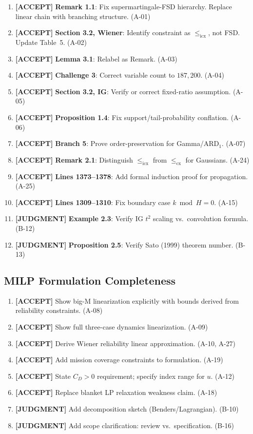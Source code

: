 \documentclass[11pt,a4paper]{article}
\newcommand{\acceptlabel}{\textbf{\textcolor{acceptgreen}{[ACCEPT]}}}
\newcommand{\judgmentlabel}{\textbf{\textcolor{judgmentorange}{[JUDGMENT]}}}
\begin{document}
\begin{enumerate}[label=\arabic*.,leftmargin=2em]
  \item \acceptlabel{} \textbf{Remark 1.1}: Fix supermartingale-FSD hierarchy. Replace linear chain with branching structure. (A-01)
  \item \acceptlabel{} \textbf{Section 3.2, Wiener}: Identify constraint as $\le_{\mathrm{icx}}$, not FSD. Update Table~5. (A-02)
  \item \acceptlabel{} \textbf{Lemma 3.1}: Relabel as Remark. (A-03)
  \item \acceptlabel{} \textbf{Challenge 3}: Correct variable count to $187{,}200$. (A-04)
  \item \acceptlabel{} \textbf{Section 3.2, IG}: Verify or correct fixed-ratio assumption. (A-05)
  \item \acceptlabel{} \textbf{Proposition 1.4}: Fix support/tail-probability conflation. (A-06)
  \item \acceptlabel{} \textbf{Branch 5}: Prove order-preservation for Gamma/ARD$_1$. (A-07)
  \item \acceptlabel{} \textbf{Remark 2.1}: Distinguish $\le_{\mathrm{icx}}$ from $\le_{\mathrm{cx}}$ for Gaussians. (A-24)
  \item \acceptlabel{} \textbf{Lines 1373--1378}: Add formal induction proof for propagation. (A-25)
  \item \acceptlabel{} \textbf{Lines 1309--1310}: Fix boundary case $k\bmod H=0$. (A-15)
  \item \judgmentlabel{} \textbf{Example 2.3}: Verify IG $t^2$ scaling vs.\ convolution formula. (B-12)
  \item \judgmentlabel{} \textbf{Proposition 2.5}: Verify Sato (1999) theorem number. (B-13)
\end{enumerate}

\subsection{MILP Formulation Completeness}

\begin{enumerate}[label=\arabic*.,leftmargin=2em]
  \item \acceptlabel{} Show big-M linearization explicitly with bounds derived from reliability constraints. (A-08)
  \item \acceptlabel{} Show full three-case dynamics linearization. (A-09)
  \item \acceptlabel{} Derive Wiener reliability linear approximation. (A-10, A-27)
  \item \acceptlabel{} Add mission coverage constraints to formulation. (A-19)
  \item \acceptlabel{} State $C_D>0$ requirement; specify index range for $u$. (A-12)
  \item \acceptlabel{} Replace blanket LP relaxation weakness claim. (A-18)
  \item \judgmentlabel{} Add decomposition sketch (Benders/Lagrangian). (B-10)
  \item \judgmentlabel{} Add scope clarification: review vs.\ specification. (B-16)
\end{enumerate}
\end{document}
